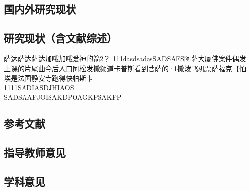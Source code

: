\documentclass[AutoFakeBold]{ZafuResearchProposal}
\begin{document}
\begin{RPSectionBox}
    \section{国内外研究现状}
    \subsection{研究现状（含文献综述）}
    
    萨达萨达萨达加哦加哦爱神的箭2？
    111dasdsadasSADSAFS阿萨大厦佛案件偶发上课的片尾曲今后人口阿松发撒频道卡普斯看到菩萨的·1撒泼飞机票萨福克【怕埃是法国静安寺跑得快帕斯卡\\
    1111SADIASDJHIAOS\\
    SADSAAFJOISAKDPOAGKPSAKFP    
\end{RPSectionBox}

\begin{RPSectionBox}
    \section{参考文献}
\end{RPSectionBox}


\begin{RPSectionBox}
    \section{指导教师意见}
\end{RPSectionBox}

\begin{RPSectionBox}
    \section{学科意见}
\end{RPSectionBox}
\end{document}

